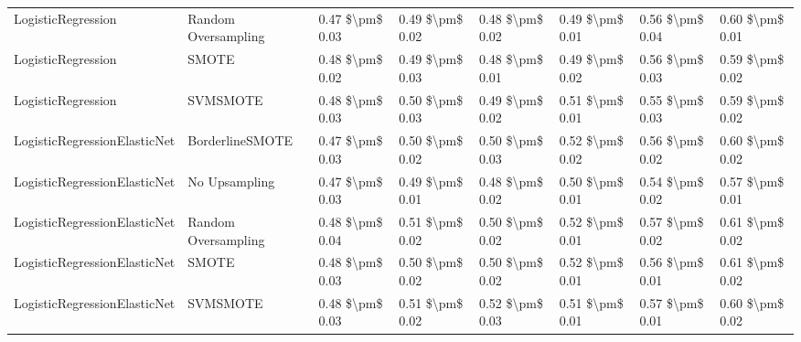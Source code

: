 \begin{tabular}{llllllll}
             LogisticRegression &           Random Oversampling & 0.47 \$\textbackslash pm\$ 0.03 &           0.49 \$\textbackslash pm\$ 0.02 &       0.48 \$\textbackslash pm\$ 0.02 &        0.49 \$\textbackslash pm\$ 0.01 &                         0.56 \$\textbackslash pm\$ 0.04 &     0.60 \$\textbackslash pm\$ 0.01 \\
             LogisticRegression &                         SMOTE & 0.48 \$\textbackslash pm\$ 0.02 &           0.49 \$\textbackslash pm\$ 0.03 &       0.48 \$\textbackslash pm\$ 0.01 &        0.49 \$\textbackslash pm\$ 0.02 &                         0.56 \$\textbackslash pm\$ 0.03 &     0.59 \$\textbackslash pm\$ 0.02 \\
             LogisticRegression &                      SVMSMOTE & 0.48 \$\textbackslash pm\$ 0.03 &           0.50 \$\textbackslash pm\$ 0.03 &       0.49 \$\textbackslash pm\$ 0.02 &        0.51 \$\textbackslash pm\$ 0.01 &                         0.55 \$\textbackslash pm\$ 0.03 &     0.59 \$\textbackslash pm\$ 0.02 \\
   LogisticRegressionElasticNet &               BorderlineSMOTE & 0.47 \$\textbackslash pm\$ 0.03 &           0.50 \$\textbackslash pm\$ 0.02 &       0.50 \$\textbackslash pm\$ 0.03 &        0.52 \$\textbackslash pm\$ 0.02 &                         0.56 \$\textbackslash pm\$ 0.02 &     0.60 \$\textbackslash pm\$ 0.02 \\
   LogisticRegressionElasticNet &                 No Upsampling & 0.47 \$\textbackslash pm\$ 0.03 &           0.49 \$\textbackslash pm\$ 0.01 &       0.48 \$\textbackslash pm\$ 0.02 &        0.50 \$\textbackslash pm\$ 0.01 &                         0.54 \$\textbackslash pm\$ 0.02 &     0.57 \$\textbackslash pm\$ 0.01 \\
   LogisticRegressionElasticNet &           Random Oversampling & 0.48 \$\textbackslash pm\$ 0.04 &           0.51 \$\textbackslash pm\$ 0.02 &       0.50 \$\textbackslash pm\$ 0.02 &        0.52 \$\textbackslash pm\$ 0.01 &                         0.57 \$\textbackslash pm\$ 0.02 &     0.61 \$\textbackslash pm\$ 0.02 \\
   LogisticRegressionElasticNet &                         SMOTE & 0.48 \$\textbackslash pm\$ 0.03 &           0.50 \$\textbackslash pm\$ 0.02 &       0.50 \$\textbackslash pm\$ 0.02 &        0.52 \$\textbackslash pm\$ 0.01 &                         0.56 \$\textbackslash pm\$ 0.01 &     0.61 \$\textbackslash pm\$ 0.02 \\
   LogisticRegressionElasticNet &                      SVMSMOTE & 0.48 \$\textbackslash pm\$ 0.03 &           0.51 \$\textbackslash pm\$ 0.02 &       0.52 \$\textbackslash pm\$ 0.03 &        0.51 \$\textbackslash pm\$ 0.01 &                         0.57 \$\textbackslash pm\$ 0.01 &     0.60 \$\textbackslash pm\$ 0.02 \\

\end{tabular}
